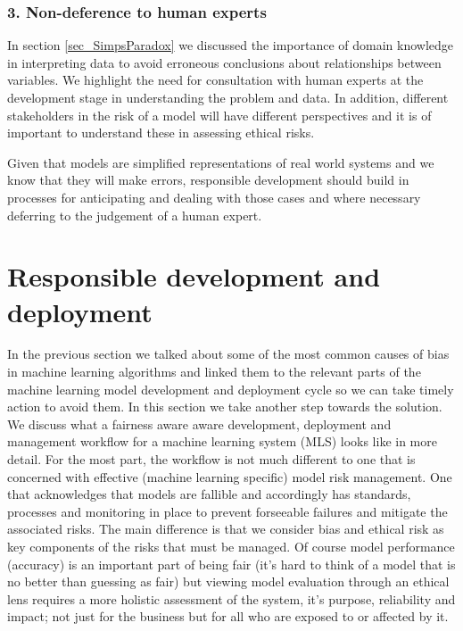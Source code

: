 \subsubsection*{3. Non-deference to human experts}

In section \ref{sec_SimpsParadox} we discussed the importance of domain knowledge in interpreting data to avoid erroneous conclusions about relationships between variables. We highlight the need for consultation with human experts at the development stage in understanding the problem and data. In addition, different stakeholders in the risk of a model will have different perspectives and it is of important to understand these in assessing ethical risks.

Given that models are simplified representations of real world systems and we know that they will make errors, responsible development should build in processes for anticipating and dealing with those cases and where necessary deferring to the judgement of a human expert.

\section{Responsible development and deployment}

In the previous section we talked about some of the most common causes of bias in machine learning algorithms and linked them to the relevant parts of the machine learning model development and deployment cycle so we can take timely action to avoid them. In this section we take another step towards the solution. We discuss what a fairness aware aware development, deployment and management workflow for a machine learning system (MLS) looks like in more detail. For the most part, the workflow is not much different to one that is concerned with effective (machine learning specific) model risk management. One that acknowledges that models are fallible and accordingly has standards, processes and monitoring in place to prevent forseeable failures and mitigate the associated risks. The main difference is that we consider bias and ethical risk as key components of the risks that must be managed. Of course model performance (accuracy) is an important part of being fair (it's hard to think of a model that is no better than guessing as fair) but viewing model evaluation through an ethical lens requires a more holistic assessment of the system, it's purpose, reliability and impact; not just for the business but for all who are exposed to or affected by it.

